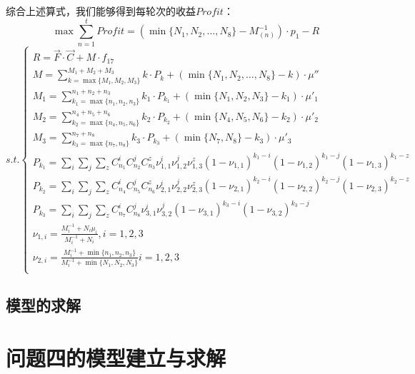 \documentclass[withoutpreface,bwprint]{cumcmthesis} %
\begin{document}
综合上述算式，我们能够得到每轮次的收益$Profit$：
$$\max	\sum_{n=1}^{t}\textit{Profit}=(\min \{N_{1},N_{2},\dots,N_{8}\}-M_{(n)}^{-1})\cdot p_{1}-R$$
\begin{equation*}
s.t.\begin{cases}
	 R=\vec{F}\cdot \vec{C} + M\cdot f_{17}\\
	 M=\sum_{k=\max \{M_{1},M_{2},M_{3}\}}^{M_{1}+M_{2}+M_{3}}k\cdot P_{k}+(\min \{N_{1},N_{2},\dots,N_{8}\}-k)\cdot \mu''\\
	 M_{1}=\sum_{k_{1}=\max \{n_{1},n_{2},n_{3}\}}^{n_{1}+n_{2}+n_{3}}k_{1}\cdot P_{k_{1}}+(\min \{N_{1},N_{2},N_{3}\}-k_{1})\cdot \mu'_{1}\\
	 M_{2}=\sum_{k_{2}=\max \{n_{4},n_{5},n_{6}\}}^{n_{4}+n_{5}+n_{6}}k_{2}\cdot P_{k_{2}}+(\min \{N_{4},N_{5},N_{6}\}-k_{2})\cdot \mu'_{2}\\
	 M_{3}=\sum_{k_{3}=\max \{n_{7},n_{8}\}}^{n_{7}+n_{8}}k_{3}\cdot P_{k_{3}}+(\min \{N_{7},N_{8}\}-k_{3})\cdot \mu'_{3}\\
	 P_{k_{1}}=\sum_{i}\sum_{j}\sum_{z}C_{n_{1}}^{i}C_{n_{2}}^{j}C_{n_{3}}^{z}\nu_{1,1}^{i}\nu_{1,2}^{j}\nu_{1,3}^{z}(1-\nu_{1,1})^{k_{1}-i}(1-\nu_{1,2})^{k_{1}-j}(1-\nu_{
	 1,3})^{k_{1}-z}\\
	 P_{k_{2}}=\sum_{i}\sum_{j}\sum_{z}C_{n_{4}}^{i}C_{n_{5}}^{j}C_{n_{6}}^{z}\nu_{2,1}^{i}\nu_{2,2}^{j}\nu_{2,3}^{z}(1-\nu_{2,1})^{k_{2}-i}(1-\nu_{2,2})^{k_{2}-j}(1-\nu_{
	 2,3})^{k_{2}-z}\\
	 P_{k_{3}}=\sum_{i}\sum_{j}\sum_{z}C_{n_{7}}^{i}C_{n_{8}}^{j}\nu_{3,1}^{i}\nu_{3,2}^{j}(1-\nu_{3,1})^{k_{3}-i}(1-\nu_{3,2})^{k_{3}-j}\\
	 \nu_{1,i}=\frac{M_{i}^{-1}+N_{i}\mu_{i}}{M_{i}^{-1}+N_{i}} ,i=1,2,3\\
	\nu_{2,i}=\frac{M_{i}^{-1}+\min \{ n_{1},n_{2},n_{3}\}}{M_{i}^{-1}+\min \{N_{1},N_{2},N_{3}\}} i=1,2,3\\
	\end{cases}
\end{equation*}





\subsection{模型的求解}
\section{问题四的模型建立与求解}
\end{document}
